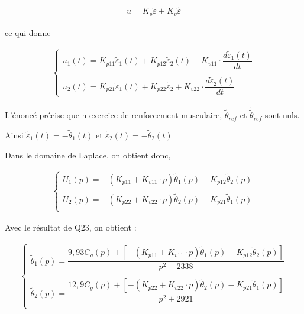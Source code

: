 \documentclass[11pt]{article}
\begin{document}
\begin{UPSTIcorrige}


\begin{align*}
u=K_p\tilde{\varepsilon}+K_v\dot{\tilde{\varepsilon}}
\end{align*}

ce qui donne 

\begin{align*}
\left\{
\begin{array}{l}
u_1(t)=K_{p11}\tilde{\varepsilon}_1(t)+K_{p12}\tilde{\varepsilon}_2(t)+K_{v11} \cdot \dfrac{d \tilde{\varepsilon}_1(t)}{dt} \\
\\
u_2(t)=K_{p21}\tilde{\varepsilon}_1(t)+K_{p22}\tilde{\varepsilon}_2+K_{v22}\cdot \dfrac{d \tilde{\varepsilon}_2(t)}{dt}
\end{array}
\right.
\end{align*}

L'énoncé précise que n exercice de renforcement musculaire, $\tilde{\theta}_{ref}$ et $\dot{\tilde{\theta}}_{ref}$ sont nuls.

Ainsi $\tilde{\varepsilon}_1(t)=-\tilde{\theta}_1(t)$ et $\tilde{\varepsilon}_2(t)=-\tilde{\theta}_2(t)$

Dans le domaine de Laplace, on obtient donc,

\begin{align*}
\left\{
\begin{array}{l}
U_1(p)=-\left(K_{p11}+K_{v11}\cdot p\right)\tilde{\theta}_1(p)-K_{p12}\tilde{\theta}_2(p)\\
\\
U_2(p)=-\left(K_{p22}+K_{v22}\cdot p\right)\tilde{\theta}_2(p)-K_{p21}\tilde{\theta}_1(p)\\
\end{array}
\right.
\end{align*}

Avec le résultat de Q23, on obtient : 


\begin{align*}
\left\{
\begin{array}{l}
\tilde{\theta}_1(p)=\dfrac{9,93C_g(p)+\left[-\left(K_{p11}+K_{v11}\cdot p\right)\tilde{\theta}_1(p)-K_{p12}\tilde{\theta}_2(p)\right]}{p^2-2338}\\
\\
\tilde{\theta}_2(p)=\dfrac{12,9C_g(p)+\left[-\left(K_{p22}+K_{v22}\cdot p\right)\tilde{\theta}_2(p)-K_{p21}\tilde{\theta}_1(p)\right]}{p^2+2921}\\
\end{array}
\right.
\end{align*}


\end{UPSTIcorrige}
\end{document}
